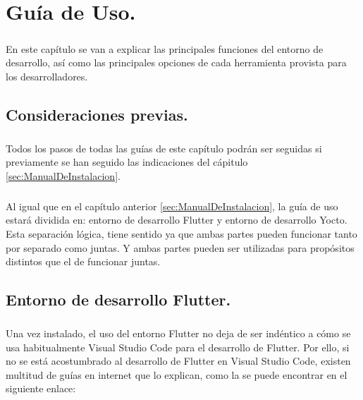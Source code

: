 \chapter{Guía de Uso.}\label{sec:GuiaDeUso}

\paragraph{}En este capítulo se van a explicar las principales funciones del entorno de
desarrollo, así como las principales opciones de cada herramienta provista para los
desarrolladores.

\section{Consideraciones previas.}

\paragraph{}Todos los pasos de todas las guías de este capítulo podrán ser seguidas si
previamente se han seguido las indicaciones del cápitulo \ref{sec:ManualDeInstalacion}.

\paragraph{}Al igual que en el capítulo anterior \ref{sec:ManualDeInstalacion}, la guía
de uso estará dividida en: entorno de desarrollo Flutter y entorno de desarrollo Yocto.
Esta separación lógica, tiene sentido ya que ambas partes pueden funcionar tanto por
separado como juntas. Y ambas partes pueden ser utilizadas para propósitos distintos
que el de funcionar juntas.

\section{Entorno de desarrollo Flutter.}

\paragraph{}Una vez instalado, el uso del entorno Flutter no deja de ser indéntico a
cómo se usa habitualmente Visual Studio Code para el desarrollo de Flutter. Por ello,
si no se está acostumbrado al desarrollo de Flutter en Visual Studio Code, existen
multitud de guías en internet que lo explican, como la se puede encontrar en el
siguiente enlace:

